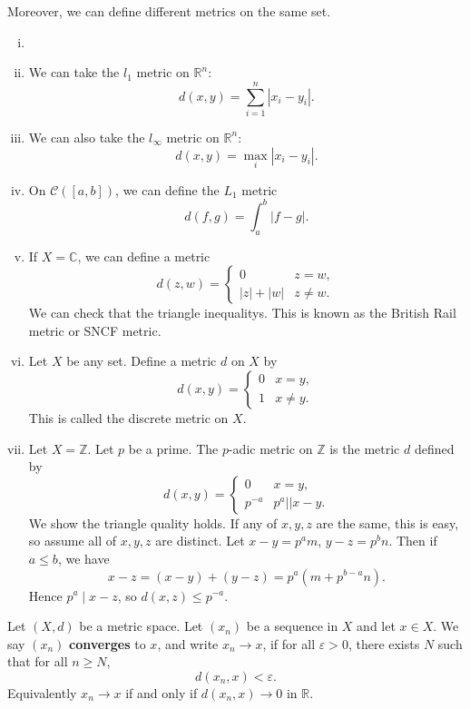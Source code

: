 \documentclass[12pt]{article}
\begin{document}
Moreover, we can define different metrics on the same set.

\begin{exbox}
	\begin{enumerate}[(i)]
		\item[]
		\item We can take the $l_1$ metric on $\mathbb{R}^{n}$:
			\[
				d(x, y) = \sum_{i = 1}^{n}|x_i - y_i|
			.\]
		\item We can also take the $l_{\infty}$ metric on $\mathbb{R}^{n}$:
			\[
				d(x, y) = \max_{i} |x_i - y_i|
			.\]
		\item On $\mathcal{C}([a, b])$, we can define the $L_1$ metric
			\[
				d(f, g) = \int_{a}^{b}|f - g|
			.\]
		\item If $X = \mathbb{C}$, we can define a metric
			\[
				d(z, w) =
				\begin{cases}
					0 & z = w,\\
					|z| + |w| & z \neq w.
				\end{cases}
			\]
			We can check that the triangle inequalitys. This is known as the British Rail metric or SNCF metric.
		\item Let $X$ be any set. Define a metric $d$ on $X$ by
			\[
				d(x, y) =
				\begin{cases}
					0 & x = y,\\
					1 & x \neq y.
				\end{cases}
			\]
			This is called the discrete metric on $X$.
		\item Let $X = \mathbb{Z}$. Let $p$ be a prime. The $p$-adic metric on $\mathbb{Z}$ is the metric $d$ defined by
			\[
				d(x, y) =
				\begin{cases}
					0 & x = y, \\
					p^{-a} & p^{a} |\!| x - y.
				\end{cases}
			\]
			We show the triangle quality holds. If any of $x, y, z$ are the same, this is easy, so assume all of $x, y, z$ are distinct. Let $x - y= p^{a}m$, $y - z = p^{b}n$. Then if $a \leq b$, we have
			\[
				x - z = (x - y) + (y - z) = p^{a}(m + p^{b-a}n)
			.\]
			Hence $p^{a} \mid x - z$, so $d(x, z) \leq p^{-a}$.
\end{enumerate}
\end{exbox}

\begin{definition}
	Let $(X, d)$ be a metric space. Let $(x_n)$ be a sequence in $X$ and let $x \in X$. We say $(x_n)$ \textbf{converges} to $x$, and write $x_n \to x$, if for all $\varepsilon > 0$, there exists $N$ such that for all $n \geq N$,
	\[
		d(x_n, x) < \varepsilon
	.\]
	Equivalently $x_n \to x$ if and only if $d(x_n, x) \to 0$ in $\mathbb{R}$.
\end{definition}
\end{document}
